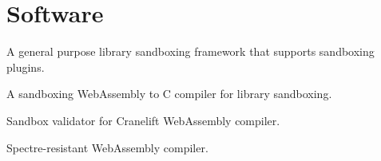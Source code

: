 \section{Software}


{A general purpose library sandboxing framework that supports sandboxing plugins.}

{A sandboxing WebAssembly to C compiler for library sandboxing.}

{Sandbox validator for Cranelift WebAssembly compiler.}

{Spectre-resistant WebAssembly compiler.}
